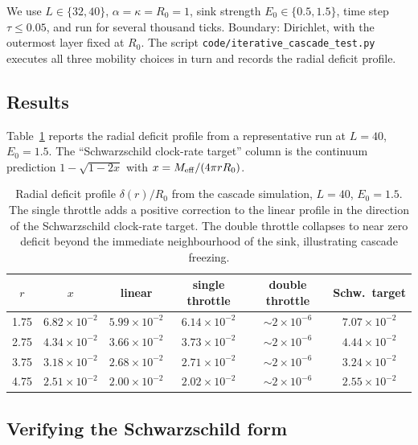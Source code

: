 \documentclass[11pt,a4paper]{article}
\begin{document}
We use $L \in \{32, 40\}$, $\alpha = \kappa = R_0 = 1$, sink
strength $E_0 \in \{0.5, 1.5\}$, time step $\tau \le 0.05$,
and run for several thousand ticks. Boundary: Dirichlet, with
the outermost layer fixed at $R_0$. The script
\texttt{code/iterative\_cascade\_test.py} executes all three
mobility choices in turn and records the radial deficit
profile.

\subsection{Results}

Table~\ref{tab:cascade} reports the radial deficit profile
from a representative run at $L = 40$, $E_0 = 1.5$. The
``Schwarzschild clock-rate target'' column is the continuum
prediction
$1 - \sqrt{1 - 2x}$ with $x = M_{\rm eff} / (4 \pi r R_0)$.

\begin{table}[h]
\centering
\small
\begin{tabular}{cccccc}
\toprule
$r$ & $x$ & linear & single throttle & double throttle & Schw.\ target\\
\midrule
1.75 & $6.82 \times 10^{-2}$ & $5.99 \times 10^{-2}$ & $6.14 \times 10^{-2}$ & $\sim 2 \times 10^{-6}$ & $7.07 \times 10^{-2}$\\
2.75 & $4.34 \times 10^{-2}$ & $3.66 \times 10^{-2}$ & $3.73 \times 10^{-2}$ & $\sim 2 \times 10^{-6}$ & $4.44 \times 10^{-2}$\\
3.75 & $3.18 \times 10^{-2}$ & $2.68 \times 10^{-2}$ & $2.71 \times 10^{-2}$ & $\sim 2 \times 10^{-6}$ & $3.24 \times 10^{-2}$\\
4.75 & $2.51 \times 10^{-2}$ & $2.00 \times 10^{-2}$ & $2.02 \times 10^{-2}$ & $\sim 2 \times 10^{-6}$ & $2.55 \times 10^{-2}$\\
\bottomrule
\end{tabular}
\caption{Radial deficit profile $\delta(r)/R_0$ from the
cascade simulation, $L = 40$, $E_0 = 1.5$. The single throttle
adds a positive correction to the linear profile in the
direction of the Schwarzschild clock-rate target. The double throttle collapses to
near zero deficit beyond the immediate neighbourhood of the
sink, illustrating cascade freezing.}
\label{tab:cascade}
\end{table}

\subsection{Verifying the Schwarzschild form}
\end{document}
